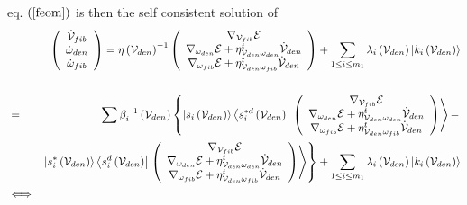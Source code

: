 eq. $\left( \ref{feom}\right) $ is then the self consistent solution of 
\begin{eqnarray}
&&\left( 
\begin{array}{c}
{\cal \dot{V}}_{fib} \\ 
\dot{\omega}_{den} \\ 
\dot{\omega}_{fib}%
\end{array}%
\right) =\eta \left( {\cal V}_{den}\right) ^{-1}\left( 
\begin{array}{c}
\nabla _{{\cal V}_{fib}}{\cal E} \\ 
\nabla _{\omega _{den}}{\cal E}+\eta _{{\cal V}_{den}\omega _{den}}^{t}{\cal 
\dot{V}}_{den} \\ 
\nabla _{\omega _{fib}}{\cal E}+\eta _{{\cal V}_{den}\omega _{fib}}^{t}{\cal 
\dot{V}}_{den}%
\end{array}%
\right) +\sum_{1\leq i\leq m_{1}}\lambda _{i}\left( {\cal V}_{den}\right)
\left| k_{i}\left( {\cal V}_{den}\right) \right\rangle  \nonumber \\
&&  \nonumber \\
&=&\sum \beta _{i}^{-1}\left( {\cal V}_{den}\right) \left\{ \left|
s_{i}\left( {\cal V}_{den}\right) \right\rangle \left\langle s_{i}^{\ast
d}\left( {\cal V}_{den}\right) \right| \left. \left( 
\begin{array}{c}
\nabla _{{\cal V}_{fib}}{\cal E} \\ 
\nabla _{\omega _{den}}{\cal E}+\eta _{{\cal V}_{den}\omega _{den}}^{t}{\cal 
\dot{V}}_{den} \\ 
\nabla _{\omega _{fib}}{\cal E}+\eta _{{\cal V}_{den}\omega _{fib}}^{t}{\cal 
\dot{V}}_{den}%
\end{array}%
\right) \right\rangle -\right.  \nonumber \\
&&\left. \left| s_{i}^{\ast }\left( {\cal V}_{den}\right) \right\rangle
\left\langle s_{i}^{d}\left( {\cal V}_{den}\right) \right| \left. \left( 
\begin{array}{c}
\nabla _{{\cal V}_{fib}}{\cal E} \\ 
\nabla _{\omega _{den}}{\cal E}+\eta _{{\cal V}_{den}\omega _{den}}^{t}{\cal 
\dot{V}}_{den} \\ 
\nabla _{\omega _{fib}}{\cal E}+\eta _{{\cal V}_{den}\omega _{fib}}^{t}{\cal 
\dot{V}}_{den}%
\end{array}%
\right) \right\rangle \right\} +\sum_{1\leq i\leq m_{1}}\lambda _{i}\left( 
{\cal V}_{den}\right) \left| k_{i}\left( {\cal V}_{den}\right) \right\rangle
\nonumber \\
&\Longleftrightarrow &  \nonumber \\

\end{eqnarray}
